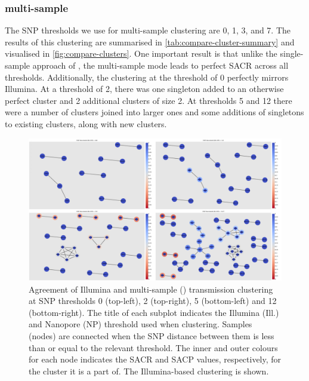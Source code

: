 \subsubsection{\pandora{} multi-sample}

The SNP thresholds we use for \pandora{} multi-sample clustering are 0, 1, 3, and 7. The results of this clustering are summarised in \autoref{tab:compare-cluster-summary} and visualised in \autoref{fig:compare-clusters}. One important result is that unlike the single-sample approach of \pandora{}, the multi-sample mode leads to perfect SACR across all thresholds. Additionally, the clustering at the threshold of 0 perfectly mirrors Illumina. At a threshold of 2, there was one singleton added to an otherwise perfect cluster and 2 additional clusters of size 2. At thresholds 5 and 12 there were a number of clusters joined into larger ones and some additions of singletons to existing clusters, along with new clusters.

\begin{figure}
\begin{center}
\includegraphics[width=0.90\columnwidth]{Chapter2/Figs/pandora_compare_clusters.png}
\caption{{Agreement of Illumina and \pandora{} multi-sample (\ont{}) transmission clustering at SNP
thresholds 0 (top-left), 2 (top-right), 5 (bottom-left) and 12 (bottom-right). The title of
each subplot indicates the Illumina (Ill.) and Nanopore (NP) threshold
used when clustering. Samples (nodes) are connected when the SNP
distance between them is less than or equal to the relevant threshold.
The inner and outer colours for each node indicates the SACR and SACP
values, respectively, for the cluster it is a part of. The
Illumina-based clustering is shown.
{\label{fig:compare-clusters}}%
}}
\end{center}
\end{figure}

